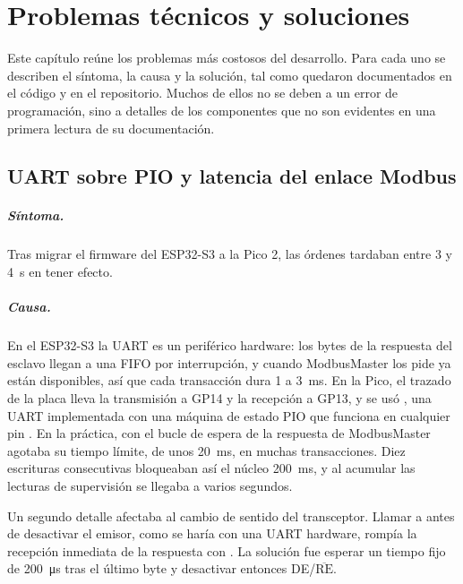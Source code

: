 \chapter{Problemas técnicos y soluciones}
\label{chap:problemas}

Este capítulo reúne los problemas más costosos del desarrollo. Para cada uno se describen el
síntoma, la causa y la solución, tal como quedaron documentados en el código y en el repositorio.
Muchos de ellos no se deben a un error de programación, sino a detalles de los componentes que no
son evidentes en una primera lectura de su documentación.

\section{UART sobre PIO y latencia del enlace Modbus}
\label{sec:prob-uart}

\paragraph{Síntoma.} Tras migrar el firmware del ESP32-S3 a la Pico 2, las órdenes tardaban entre 3 y
\SI{4}{\second} en tener efecto.

\paragraph{Causa.} En el ESP32-S3 la UART es un periférico hardware: los bytes de la respuesta del
esclavo llegan a una FIFO por interrupción, y cuando ModbusMaster los pide ya están disponibles, así
que cada transacción dura 1 a \SI{3}{\milli\second}. En la Pico, el trazado de la placa lleva la
transmisión a GP14 y la recepción a GP13, y se usó , una UART implementada con una
máquina de estado PIO que funciona en cualquier pin
.
En la práctica, con  el bucle de espera de la respuesta de ModbusMaster agotaba
su tiempo límite, de unos \SI{20}{\milli\second}, en muchas transacciones. Diez escrituras
consecutivas bloqueaban así el núcleo \SI{200}{\milli\second}, y al acumular las lecturas de
supervisión se llegaba a varios segundos.

Un segundo detalle afectaba al cambio de sentido del transceptor. Llamar a  antes de
desactivar el emisor, como se haría con una UART hardware, rompía la recepción inmediata de la
respuesta con . La solución fue esperar un tiempo fijo de \SI{200}{\micro\second}
tras el último byte y desactivar entonces DE/$\overline{\text{RE}}$.

